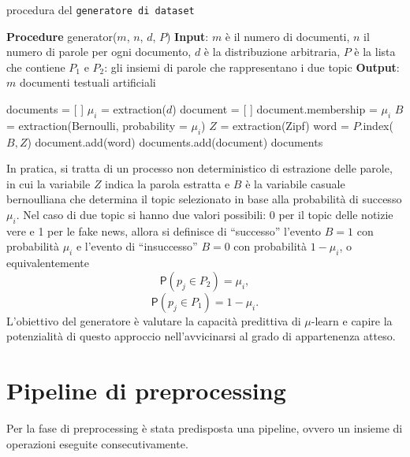 \documentclass[12pt]{report}
\theoremstyle{definition}
\begin{document}
\begin{algorithm}
\caption{procedura del \texttt{generatore di dataset}}
\label{lda}
\hspace*{\algorithmicindent} \textbf{Procedure} generator($m$, $n$, $d$, $P$)
\newline
\hspace*{\algorithmicindent} \textbf{Input}: $m$ è il numero di documenti, $n$ il numero di parole per ogni documento, $d$ è la distribuzione arbitraria, $P$ è la lista che contiene $P_1$ e $P_2$: gli insiemi di parole che rappresentano i due topic
\newline
\hspace*{\algorithmicindent} \textbf{Output}: $m$ documenti testuali artificiali
\begin{algorithmic}[1]
\STATE documents = [ ]
\STATE $\mu_i$ = extraction($d$)
\STATE document = [ ]
\STATE document.membership = $\mu_i$
\STATE $B$ = extraction(Bernoulli, probability = $\mu_i$)
\STATE $Z$ = extraction(Zipf)
\STATE word = $P$.index($B, Z$)
\STATE document.add(word)
\ENDFOR
\STATE documents.add(document)
\ENDFOR
\RETURN documents
\end{algorithmic}
\end{algorithm}
In pratica, si tratta di un processo non deterministico di estrazione delle parole, in cui la variabile $Z$ indica la parola estratta e $B$ è la variabile casuale bernoulliana che determina il topic selezionato in base alla probabilità di successo $\mu_i$. Nel caso di due topic si hanno due valori possibili: 0 per il topic delle notizie vere e 1 per le fake news, allora si definisce di ``successo'' l'evento $B=1$ con probabilità $\mu_i$ e l'evento di ``insuccesso'' $B=0$ con probabilità $1-\mu_i$, o equivalentemente
\begin{equation}
    \mathsf{P}(p_j \in P_2) = \mu_i,
\end{equation}
\begin{equation}
    \mathsf{P}(p_j \in P_1) = 1 - \mu_i.
\end{equation}
L'obiettivo del generatore è valutare la capacità predittiva di $\mu$-learn e capire la potenzialità di questo approccio nell'avvicinarsi al grado di appartenenza atteso.

\section{Pipeline di preprocessing}\label{pp}
Per la fase di preprocessing è stata predisposta una pipeline, ovvero un insieme di operazioni eseguite consecutivamente.
\end{document}
